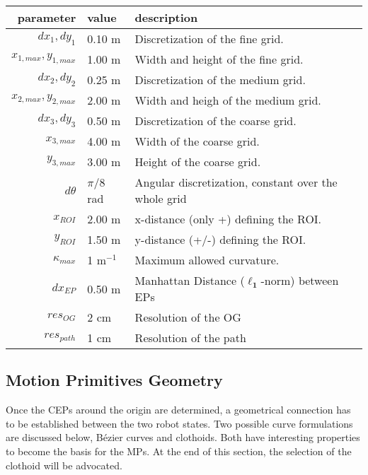 \begin{table}[!htbp]
\centering
{}
\vspace{0.2cm}
\begin{tabular}{ r | l | l}
parameter							& 		value			& description	\\ \hline \hline
$dx_1,dy_1$ 						& 		0.10 m 		& Discretization of the fine grid.	\\ \hline
$x_{1,max},y_{1,max}$ 	& 		1.00 m		& Width and height of the fine grid.	\\ \hline
$dx_2,dy_2$ 						& 		0.25 m 		& Discretization of the medium grid.	\\ \hline
$x_{2,max},y_{2,max}$		&		2.00 m		& Width and heigh of the medium grid. \\ \hline
$dx_3,dy_3$ 						& 		0.50 m 		& Discretization of the coarse grid.	\\ \hline
$x_{3,max}$ 						& 		4.00 m		& Width of the coarse grid.	\\ \hline
$y_{3,max}$ 						& 		3.00 m		& Height of the coarse grid.	\\ \hline
$d\theta$							& 		$\pi$/8 rad	& Angular discretization, constant over the whole grid	\\ \hline
$x_{ROI}$ 							&		2.00 m 		& x-distance (only +) defining the ROI.	\\ \hline
$y_{ROI}$							& 		1.50 m		& y-distance (+/-) defining the ROI. 		\\ \hline
$\kappa_{max}$ 				& 		1 m$ ^{-1}$	& Maximum allowed curvature.		 \\ \hline 	
$dx_{EP}$							&		0.50 m		& Manhattan Distance ($\bm{\ell_1}$-norm) between EPs \\ \hline
$res_{OG}$						&		2 cm			& Resolution of the OG\\ \hline 
$res_{path}$						&		1 cm			& Resolution of the path
\end{tabular}
\end{table}
\newpage

\subsection{Motion Primitives Geometry} \label{sec:MPG}
Once the CEPs around the origin are determined, a geometrical connection has to be established between the two robot states. Two possible curve formulations are discussed below, Bézier curves and clothoids. Both have interesting properties to become the basis for the MPs. At the end of this section, the selection of the clothoid will be advocated.

